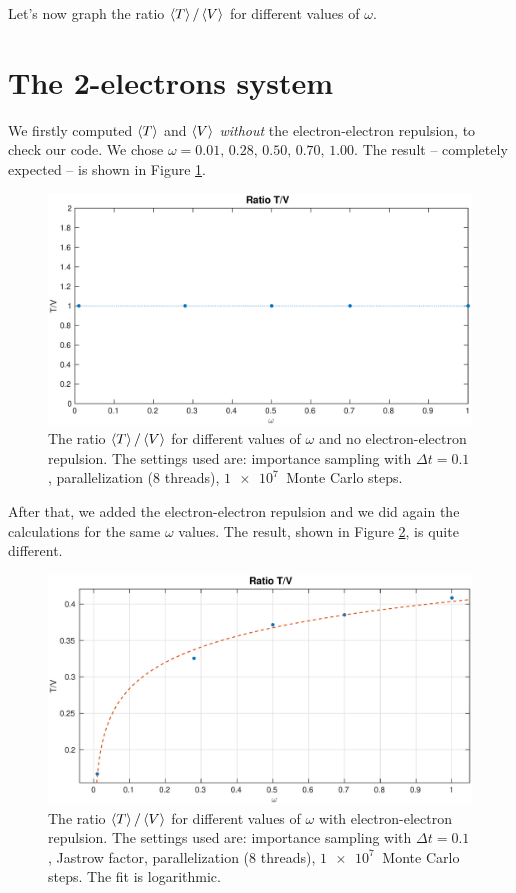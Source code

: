 \documentclass[a4paper,twoside,11pt]{book}
\begin{document}
Let's now graph the ratio $\Braket{T} / \Braket{V}$ for different values of $\omega$.

\section{The 2-electrons system}

We firstly computed $\Braket{T}$ and $\Braket{V}$ \emph{without} the electron-electron repulsion, to check our code. We chose $\omega=0.01,\,0.28,\,0.50,\,0.70,\,1.00$. The result -- completely expected -- is shown in Figure \ref{fig:virial_2e-norep}.
\begin{figure}[H]
	\centering
	\includegraphics[width=\textwidth]{virial_2e-norep}
	\caption{The ratio $\Braket{T} / \Braket{V}$ for different values of $\omega$ and no electron-electron repulsion. The settings used are: importance sampling with $\Delta t = 0.1$, parallelization (8 threads), $\SI{1e7}{}$ Monte Carlo steps.}
	\label{fig:virial_2e-norep}
\end{figure}

After that, we added the electron-electron repulsion and we did again the calculations for the same $\omega$ values. The result, shown in Figure \ref{fig:virial_2e-rep}, is quite different.

\begin{figure}[H]
	\centering
	\includegraphics[width=\textwidth]{virial_2e-rep}
	\caption{The ratio $\Braket{T} / \Braket{V}$ for different values of $\omega$ with electron-electron repulsion. The settings used are: importance sampling with $\Delta t = 0.1$, Jastrow factor, parallelization (8 threads), $\SI{1e7}{}$ Monte Carlo steps. The fit is logarithmic.}
	\label{fig:virial_2e-rep}
\end{figure}
\end{document}
